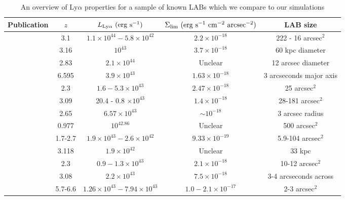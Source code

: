     \begin{table}
    \caption{An overview of Ly$\alpha$ properties for a sample of known LABs which we compare to our simulations}
    \centering
    \begin{tabular}{ | l | c | c | c | c | }
    \hline
        Publication & $z$ & $L_{\rm{Ly}\alpha}\ (\rm{erg}\ \rm{s}^{-1})$ & $\Sigma_{\rm{lim}}\ (\rm{erg}\ \rm{s}^{-1}\ \rm{cm}^{-2}\ \rm{arcsec}^{-2})$ & LAB size \\
    \hline

    \citet{Matsuda2004} & 3.1 & $1.1\times10^{44} - 5.8\times10^{42}$ & $2.2\times10^{-18}$ & 222 - 16 arcsec$^2$\\
    \hline

    \citet{Nilsson2006} & 3.16 &  $10^{43}$ & $3.7\times10^{-18}$ & 60 kpc diameter \\
    \hline

    \citet{Smith2007} & 2.83 & $2.1\times10^{44}$ & Unclear & 12 arcsec diameter \\
    \hline

    \citet{Ouchi2009} & 6.595 & $3.9\times10^{43}$ & $1.63\times10^{-18}$ & 3 arcseconds major axis \\
    \hline

    \citet{Yang2009} & 2.3 & $1.6-5.3\times10^{43}$ & $2.47\times10^{-18}$ & 25 arcsec$^{2}$\\
    \hline

    \citet{Matsuda2011} & 3.09 & 20.4 - 0.8 $\times10^{43}$ & $1.4\times10^{-18}$ & 28-181 arcsec$^{2}$\\
    \hline

    \citet{Steidel2011} & 2.65 & $6.57\times10^{43}$ & $\sim10^{-18}$ & 3 arcsec radius \\
    \hline

    \citet{Barger2012} & 0.977 & $10^{42.86}$ & Unclear & 500 arcsec$^{2}$ \\
    \hline

    \citet{Prescott2013} & 1.7-2.7 & $1.9\times10^{43}-2.6\times10^{42}$ & $9.33\times10^{-19}$ & 5.9-104 arcsec$^{2}$ \\
    \hline

    \citet{Caminha2016} & 3.118 & $1.9\times10^{42}$ & Unclear & 33 kpc \\
    \hline

    \citet{Badescu2017} & 2.3 & $0.9-1.3\times10^{43}$ & $2.1\times10^{-18}$ & 10-12 arcsec$^{2}$ \\ 
    \hline

    \citet{North2017} & 3.08 & $2.2\times10^{43}$ & $7.5\times10^{-18}$ & 3-4 arcseconds across\\
    \hline

    \citet{Shibuya2017} & 5.7-6.6 & $1.26\times10^{43} - 7.94\times10^{43}$ & $1.0 - 2.1\times10^{-17}$ & 2-3 arcsec$^{2}$\\
    \hline

    \end{tabular}
    \label{table:labs}
    \end{table}


